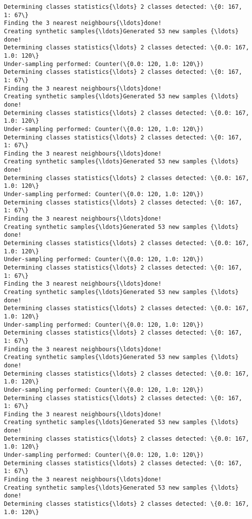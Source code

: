 \documentclass{article}
\begin{document}
\begin{Verbatim}[commandchars=\\\{\}]
Determining classes statistics{\ldots} 2 classes detected: \{0: 167, 1: 67\}
Finding the 3 nearest neighbours{\ldots}done!
Creating synthetic samples{\ldots}Generated 53 new samples {\ldots}
done!
Determining classes statistics{\ldots} 2 classes detected: \{0.0: 167, 1.0: 120\}
Under-sampling performed: Counter(\{0.0: 120, 1.0: 120\})
Determining classes statistics{\ldots} 2 classes detected: \{0: 167, 1: 67\}
Finding the 3 nearest neighbours{\ldots}done!
Creating synthetic samples{\ldots}Generated 53 new samples {\ldots}
done!
Determining classes statistics{\ldots} 2 classes detected: \{0.0: 167, 1.0: 120\}
Under-sampling performed: Counter(\{0.0: 120, 1.0: 120\})
Determining classes statistics{\ldots} 2 classes detected: \{0: 167, 1: 67\}
Finding the 3 nearest neighbours{\ldots}done!
Creating synthetic samples{\ldots}Generated 53 new samples {\ldots}
done!
Determining classes statistics{\ldots} 2 classes detected: \{0.0: 167, 1.0: 120\}
Under-sampling performed: Counter(\{0.0: 120, 1.0: 120\})
Determining classes statistics{\ldots} 2 classes detected: \{0: 167, 1: 67\}
Finding the 3 nearest neighbours{\ldots}done!
Creating synthetic samples{\ldots}Generated 53 new samples {\ldots}
done!
Determining classes statistics{\ldots} 2 classes detected: \{0.0: 167, 1.0: 120\}
Under-sampling performed: Counter(\{0.0: 120, 1.0: 120\})
Determining classes statistics{\ldots} 2 classes detected: \{0: 167, 1: 67\}
Finding the 3 nearest neighbours{\ldots}done!
Creating synthetic samples{\ldots}Generated 53 new samples {\ldots}
done!
Determining classes statistics{\ldots} 2 classes detected: \{0.0: 167, 1.0: 120\}
Under-sampling performed: Counter(\{0.0: 120, 1.0: 120\})
Determining classes statistics{\ldots} 2 classes detected: \{0: 167, 1: 67\}
Finding the 3 nearest neighbours{\ldots}done!
Creating synthetic samples{\ldots}Generated 53 new samples {\ldots}
done!
Determining classes statistics{\ldots} 2 classes detected: \{0.0: 167, 1.0: 120\}
Under-sampling performed: Counter(\{0.0: 120, 1.0: 120\})
Determining classes statistics{\ldots} 2 classes detected: \{0: 167, 1: 67\}
Finding the 3 nearest neighbours{\ldots}done!
Creating synthetic samples{\ldots}Generated 53 new samples {\ldots}
done!
Determining classes statistics{\ldots} 2 classes detected: \{0.0: 167, 1.0: 120\}
Under-sampling performed: Counter(\{0.0: 120, 1.0: 120\})
Determining classes statistics{\ldots} 2 classes detected: \{0: 167, 1: 67\}
Finding the 3 nearest neighbours{\ldots}done!
Creating synthetic samples{\ldots}Generated 53 new samples {\ldots}
done!
Determining classes statistics{\ldots} 2 classes detected: \{0.0: 167, 1.0: 120\}

\end{Verbatim}
\end{document}
